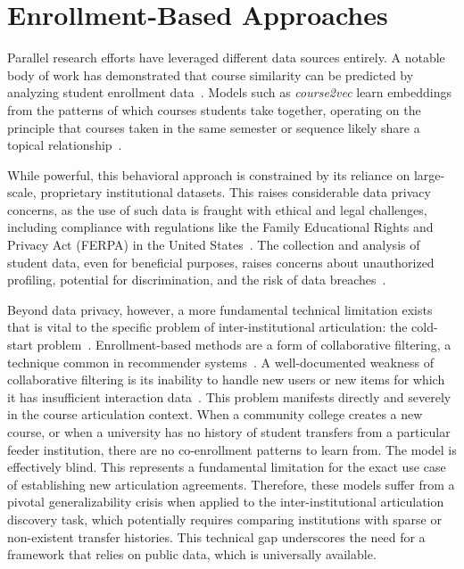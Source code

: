 \section{Enrollment-Based Approaches}\label{ch:2.5}
Parallel research efforts have leveraged different data sources entirely.  A notable body of work has demonstrated that course similarity can be predicted by analyzing student enrollment data~\cite{PardosCourse2Vec2019, JiangPardosMulti2VecEDM2020}.  Models such as \emph{course2vec} learn embeddings from the patterns of which courses students take together, operating on the principle that courses taken in the same semester or sequence likely share a topical relationship~\cite{PardosCourse2Vec2019}.

While powerful, this behavioral approach is constrained by its reliance on large-scale, proprietary institutional datasets. This raises considerable data privacy concerns, as the use of such data is fraught with ethical and legal challenges, including compliance with regulations like the Family Educational Rights and Privacy Act (FERPA) in the United States~\cite{sabourin2015}. The collection and analysis of student data, even for beneficial purposes, raises concerns about unauthorized profiling, potential for discrimination, and the risk of data breaches~\cite{sabourin2015}.

Beyond data privacy, however, a more fundamental technical limitation exists that is vital to the specific problem of inter-institutional articulation: the cold-start problem~\cite{10246926,10339320,googlerecommendation}. Enrollment-based methods are a form of collaborative filtering, a technique common in recommender systems~\cite{10246926}. A well-documented weakness of collaborative filtering is its inability to handle new users or new items for which it has insufficient interaction data~\cite{10246926,10339320,googlerecommendation}. This problem manifests directly and severely in the course articulation context. When a community college creates a new course, or when a university has no history of student transfers from a particular feeder institution, there are no co-enrollment patterns to learn from. The model is effectively blind. This represents a fundamental limitation for the exact use case of establishing new articulation agreements. Therefore, these models suffer from a pivotal generalizability crisis when applied to the inter-institutional articulation discovery task, which potentially requires comparing institutions with sparse or non-existent transfer histories. This technical gap underscores the need for a framework that relies on public data, which is universally available.

